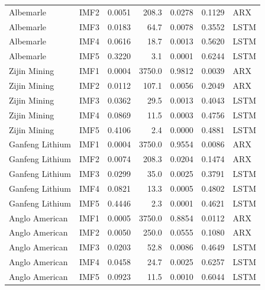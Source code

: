 \begin{longtable}{llrrrrl}
Albemarle & IMF2 & 0.0051 & 208.3 & 0.0278 & 0.1129 & ARX \\
Albemarle & IMF3 & 0.0183 & 64.7 & 0.0078 & 0.3552 & LSTM \\
Albemarle & IMF4 & 0.0616 & 18.7 & 0.0013 & 0.5620 & LSTM \\
Albemarle & IMF5 & 0.3220 & 3.1 & 0.0001 & 0.6244 & LSTM \\
Zijin Mining & IMF1 & 0.0004 & 3750.0 & 0.9812 & 0.0039 & ARX \\
Zijin Mining & IMF2 & 0.0112 & 107.1 & 0.0056 & 0.2049 & ARX \\
Zijin Mining & IMF3 & 0.0362 & 29.5 & 0.0013 & 0.4043 & LSTM \\
Zijin Mining & IMF4 & 0.0869 & 11.5 & 0.0003 & 0.4756 & LSTM \\
Zijin Mining & IMF5 & 0.4106 & 2.4 & 0.0000 & 0.4881 & LSTM \\
Ganfeng Lithium & IMF1 & 0.0004 & 3750.0 & 0.9554 & 0.0086 & ARX \\
Ganfeng Lithium & IMF2 & 0.0074 & 208.3 & 0.0204 & 0.1474 & ARX \\
Ganfeng Lithium & IMF3 & 0.0299 & 35.0 & 0.0025 & 0.3791 & LSTM \\
Ganfeng Lithium & IMF4 & 0.0821 & 13.3 & 0.0005 & 0.4802 & LSTM \\
Ganfeng Lithium & IMF5 & 0.4446 & 2.3 & 0.0001 & 0.4621 & LSTM \\
Anglo American & IMF1 & 0.0005 & 3750.0 & 0.8854 & 0.0112 & ARX \\
Anglo American & IMF2 & 0.0050 & 250.0 & 0.0555 & 0.1080 & ARX \\
Anglo American & IMF3 & 0.0203 & 52.8 & 0.0086 & 0.4649 & LSTM \\
Anglo American & IMF4 & 0.0458 & 24.7 & 0.0025 & 0.6257 & LSTM \\
Anglo American & IMF5 & 0.0923 & 11.5 & 0.0010 & 0.6044 & LSTM \\
\end{longtable}
